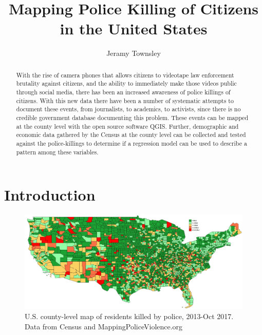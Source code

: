 \documentclass[sigconf]{acmart}
\begin{document}
\title{Mapping Police Killing of Citizens in the United States}

\author{Jeramy Townsley}


\begin{abstract}
With the rise of camera phones that allows citizens to videotape law enforcement brutality against citizens, and the ability to immediately make those videos public through social media, there has been an increased awareness of police killings of citizens.  With this new data there have been a number of systematic attempts to document these events, from journalists, to academics, to activists, since there is no credible government database documenting this problem. These events can be mapped at the county level with the open source software QGIS.  Further, demographic and economic data gathered by the Census at the county level can be collected and tested against the police-killings to determine if a regression model can be used to describe a pattern among these variables. 
\end{abstract}


\maketitle

\section{Introduction}


\begin{figure}
\includegraphics[width=1.0\textwidth]{images/figure1.jpg}
\caption{U.S. county-level map of residents killed by police, 2013-Oct 2017.  Data from Census and MappingPoliceViolence.org}
\end{figure}
\end{document}
